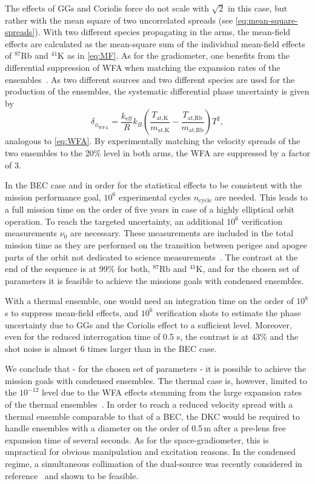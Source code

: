 The effects of GGs and Coriolis force do not scale with $\sqrt{2}$ in this case, but rather with the mean square of two uncorrelated spreads (see \autoref{eq:mean-square-spreads}).
With two different species propagating in the arms, the mean-field effects are calculated as the mean-square sum of the individual mean-field effects of $^{87}$Rb and $^{41}$K as in \autoref{eq:MF}.
As for the gradiometer, one benefits from the differential suppression of WFA when matching the expansion rates of the ensembles~\cite{Aguilera2014}. As two different sources and two different species are used for the production of the ensembles, the systematic differential phase uncertainty is given by
\begin{equation}
    \delta_{\phi_\text{WFA}}= \frac{k_\text{eff}}{R} k_B \left(\frac{T_\text{at,K}}{m_\text{at,K}}-\frac{T_\text{at,Rb}}{m_\text{at,Rb}}\right)T^2,
\end{equation}
analogous to \autoref{eq:WFA}. 
By experimentally matching the velocity spreads of the two ensembles to the 20\% level in both arms, the WFA are suppressed by a factor of 3.

In the BEC case and in order for the statistical effects to be consistent with the mission performance goal, $10^6$ experimental cycles $n_\text{cycle}$ are needed. This leads to a full mission time on the order of five years in case of a highly elliptical orbit operation.
To reach the targeted uncertainty, an additional $10^6$ verification measurements $\nu_0$ are necessary. These measurements are included in the total mission time as they are performed on the transition between perigee and apogee parts of the orbit not dedicated to science measurements~\cite{Aguilera2014}. The contrast at the end of the sequence is at 99\% for both, $^{87}$Rb and $^{41}$K, and for the chosen set of parameters it is feasible to achieve the missions goals with condensed ensembles.

With a thermal ensemble, one would need an integration time on the order of $10^8$ s to suppress mean-field effects, and $10^6$ verification shots to estimate the phase uncertainty due to GGs and the Coriolis effect to a sufficient level. Moreover, even for the reduced interrogation time of 0.5 s, the contrast is at 43\% and the shot noise is almost 6 times larger than in the BEC case.

We conclude that - for the chosen set of parameters - it is possible to achieve the mission goals with condensed ensembles. The thermal case is, however, limited to the $10^{-12}$ level due to the WFA effects stemming from the large expansion rates of the thermal ensembles~\cite{Karcher2018}. In order to reach a reduced velocity spread with a thermal ensemble comparable to that of a BEC, the DKC would be required to handle ensembles with a diameter on the order of 0.5\,m after a pre-lens free expansion time of several seconds. As for the space-gradiometer, this is unpractical for obvious manipulation and excitation reasons. In the condensed regime, a simultaneous collimation of the dual-source was recently considered in reference~\cite{Corgier2020} and shown to be feasible.